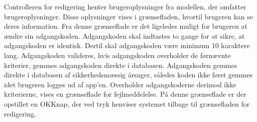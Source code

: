 \noindent
Controlleren for redigering henter brugeroplysninger fra modellen, der omfatter brugeroplysninger. Disse oplysninger vises i grænsefladen, hvortil brugeren kan se deres information. Fra denne grænseflade er det ligeledes muligt for brugeren at ændre sin adgangskoden. Adgangskoden skal indtastes to gange for at sikre, at adgangskoden er identisk. Dertil skal adgangskoden være minimum 10 karaktere lang. Adgangskoden valideres, hvis adgangskoden overholder de førnævnte kriterier, gemmes adgangskoden direkte i databasen. Adgangskoden gemmes direkte i databasen af sikkerhedsmæssig årsager, således koden ikke først gemmes idet brugeren logges ud af app'en. 
Overholder adgangskoderne derimod ikke kriterierne, vises en grænseflade for fejlmeddelelse. På denne grænseflade er der opstillet en OKKnap, der ved tryk henviser systemet tilbage til grænsefladen for redigering. 
